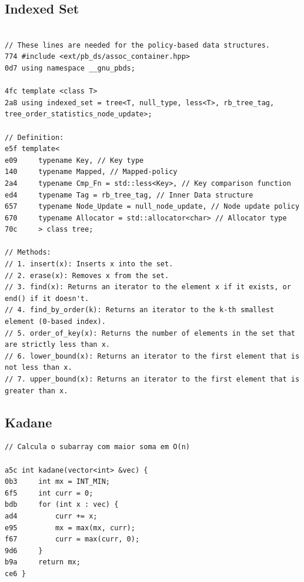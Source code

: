 \documentclass[11pt, a4paper, twoside]{article}
\begin{document}
\subsection{Indexed Set}
\begin{lstlisting}

// These lines are needed for the policy-based data structures.
774 #include <ext/pb_ds/assoc_container.hpp>
0d7 using namespace __gnu_pbds;

4fc template <class T>
2a8 using indexed_set = tree<T, null_type, less<T>, rb_tree_tag, tree_order_statistics_node_update>;

// Definition:
e5f template<
e09     typename Key, // Key type
140     typename Mapped, // Mapped-policy
2a4     typename Cmp_Fn = std::less<Key>, // Key comparison function
ed4     typename Tag = rb_tree_tag, // Inner Data structure
657     typename Node_Update = null_node_update, // Node update policy
670     typename Allocator = std::allocator<char> // Allocator type
70c     > class tree;

// Methods:
// 1. insert(x): Inserts x into the set.
// 2. erase(x): Removes x from the set.
// 3. find(x): Returns an iterator to the element x if it exists, or end() if it doesn't.
// 4. find_by_order(k): Returns an iterator to the k-th smallest element (0-based index).
// 5. order_of_key(x): Returns the number of elements in the set that are strictly less than x.
// 6. lower_bound(x): Returns an iterator to the first element that is not less than x.
// 7. upper_bound(x): Returns an iterator to the first element that is greater than x.
\end{lstlisting}

\subsection{Kadane}
\begin{lstlisting}
// Calcula o subarray com maior soma em O(n)

a5c int kadane(vector<int> &vec) {
0b3     int mx = INT_MIN;
6f5     int curr = 0;
bdb     for (int x : vec) {
ad4         curr += x;
e95         mx = max(mx, curr);
f67         curr = max(curr, 0);
9d6     }
b9a     return mx;
ce6 }
\end{lstlisting}
\end{document}
